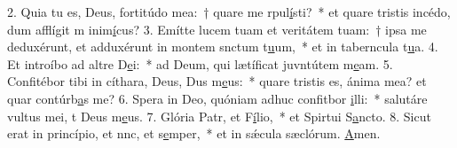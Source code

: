 2. Quia tu es, Deus, fortitúdo mea:~† quare me rpul\uline{í}sti?~* et quare tristis incédo, dum afflígit m inim\uline{í}cus?
3. Emítte lucem tuam et veritátem tuam:~† ipsa me deduxérunt, et adduxérunt in montem snctum t\uline{u}um,~* et in taberncula t\uline{u}a.
4. Et introíbo ad altre D\uline{e}i:~* ad Deum, qui lætíficat juvntútem m\uline{e}am.
5. Confitébor tibi in cíthara, Deus, Dus m\uline{e}us:~* quare tristis es, ánima mea? et quar contúrb\uline{a}s me?
6. Spera in Deo, quóniam adhuc confitbor \uline{i}lli:~* salutáre vultus mei, t Deus m\uline{e}us.
7. Glória Patr, et F\uline{í}lio,~* et Spirtui S\uline{a}ncto.
8. Sicut erat in princípio, et nnc, et s\uline{e}mper,~* et in sǽcula sæclórum. \uline{A}men.

